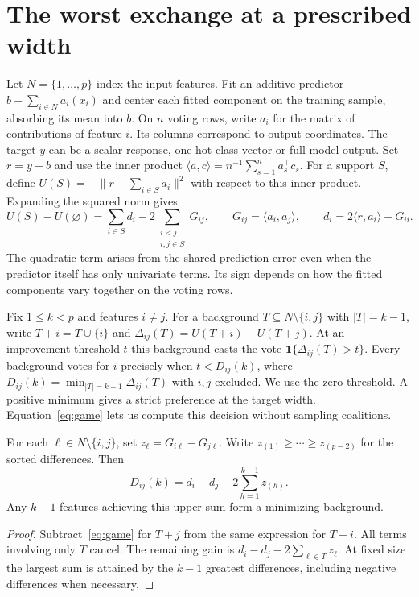 \section{The worst exchange at a prescribed width}
\label{sec:exchange}
Let $N=\{1,\ldots,p\}$ index the input features. Fit an additive predictor
$b+\sum_{i\in N}a_i(x_i)$ and center each fitted component on the training
sample, absorbing its mean into $b$. On $n$ voting rows, write $a_i$ for
the matrix of contributions of feature $i$. Its columns correspond to
output coordinates. The target $y$ can be a scalar response, one-hot class
vector or full-model output. Set $r=y-b$ and use the inner product
$\langle a,c\rangle=n^{-1}\sum_{s=1}^n a_s^\top c_s$. For a support $S$,
define $U(S)=-\|r-\sum_{i\in S}a_i\|^2$ with respect to this inner product.
Expanding the squared norm gives
\begin{equation}
 U(S)-U(\varnothing)=\sum_{i\in S}d_i-2\sum_{\substack{i<j\\i,j\in S}}G_{ij},
 \qquad G_{ij}=\langle a_i,a_j\rangle,\qquad
 d_i=2\langle r,a_i\rangle-G_{ii}.
 \label{eq:game}
\end{equation}
The quadratic term arises from the shared prediction error even when the
predictor itself has only univariate terms. Its sign depends on how the fitted
components vary together on the voting rows.

Fix $1\le k<p$ and features $i\ne j$. For a background $T\subseteq
N\setminus\{i,j\}$ with $|T|=k-1$, write $T+i=T\cup\{i\}$ and
$\Delta_{ij}(T)=U(T+i)-U(T+j)$. At an improvement threshold $t$ this
background casts the vote $\mathbf 1\{\Delta_{ij}(T)>t\}$. Every background
votes for $i$ precisely when $t<D_{ij}(k)$, where
$D_{ij}(k)=\min_{|T|=k-1}\Delta_{ij}(T)$ with $i,j$ excluded. We use the
zero threshold. A positive minimum gives a strict preference at the target
width. Equation~\eqref{eq:game} lets us compute this decision without
sampling coalitions.

\begin{proposition}
For each $\ell\in N\setminus\{i,j\}$, set $z_\ell=G_{i\ell}-G_{j\ell}$.
Write $z_{(1)}\ge\cdots\ge z_{(p-2)}$ for the sorted differences. Then
\begin{equation}
 D_{ij}(k)=d_i-d_j-2\sum_{h=1}^{k-1}z_{(h)}.
 \label{eq:exchange}
\end{equation}
Any $k-1$ features achieving this upper sum form a minimizing background.
\end{proposition}
\begin{proof}
Subtract~\eqref{eq:game} for $T+j$ from the same expression for $T+i$.
All terms involving only $T$ cancel. The remaining gain is
$d_i-d_j-2\sum_{\ell\in T}z_\ell$. At fixed size the largest sum is attained
by the $k-1$ greatest differences, including negative differences when
necessary.
\end{proof}

